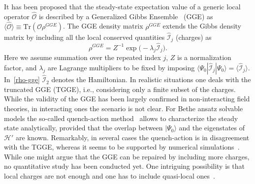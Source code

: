 \documentclass[twocolumn,superscriptaddress,prb,10pt]{revtex4-1}
\begin{document}
It has been proposed that the steady-state expectation value of a generic local 
operator $\hat{\mathcal O}$ is described by a Generalized Gibbs Ensemble~\cite{
rigol-2008} (GGE) as $\langle\hat{\mathcal O}\rangle\equiv\textrm{Tr}({\mathcal O}
\rho^{GGE})$. The GGE density matrix $\rho^{GGE}$ extends the Gibbs density matrix 
by including  all the local conserved quantities $\hat {\mathcal I}_j$ (charges) as 
%
\begin{equation}
\rho^{GGE}=Z^{-1}\exp\big(-\lambda_j\hat{\mathcal I}_j\big). 
\label{rho-gge}
\end{equation}
%
Here we assume summation over the repeated index $j$, $Z$ is a normalization 
factor, and $\lambda_j$ are Lagrange multipliers to be fixed by imposing 
$\langle\Psi_0|\hat{\mathcal I}_j|\Psi_0\rangle=\langle\hat{\mathcal I}_j\rangle$. 
In~\eqref{rho-gge} $\hat{\mathcal I}_2$ denotes the Hamiltonian. 
In realistic situations one deals with the truncated GGE (TGGE), i.e., 
considering only a finite subset of the charges. While the validity of the GGE 
has been largely confirmed in non-interacting field theories, in interacting 
ones the scenario is not clear. For Bethe ansatz solvable models the so-called 
quench-action method~\cite{caux-2013} allows to characterize the steady state 
analytically, provided that the overlap between $|\Psi_0\rangle$ and the 
eigenstates of ${\mathcal H}'$ are known. Remarkably, in several cases the 
quench-action is in disagreement with the TGGE, whereas it seems to be 
supported by numerical simulations~\cite{pozsgay-2014}. 
While one might argue that the GGE can be repaired by including more charges, 
no quantitative study has been conducted yet. One intriguing possibility is 
that local charges are not enough and one has to include quasi-local 
ones~\cite{ilievski-2015}. 
\end{document}
